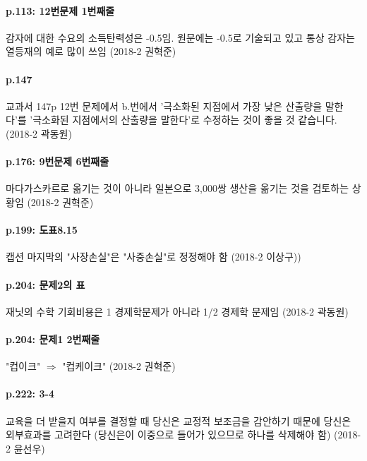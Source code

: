 \documentclass[a4paper]{article}
\begin{document}
\paragraph{p.113: 12번문제 1번째줄} %
\label{par:p_113_12}
감자에 대한 수요의 소득탄력성은 -0.5임. 원문에는 -0.5로 기술되고 있고 통상 감자는 열등재의 예로 많이 쓰임 (2018-2 권혁준)

\paragraph{p.147} %
\label{par:p_147}
교과서 147p 12번 문제에서 b.번에서 '극소화된 지점에서 가장 낮은 산출량을 말한다'를 '극소화된 지점에서의 산출량을 말한다'로 수정하는 것이 좋을 것 같습니다. (2018-2 곽동원)

\paragraph{p.176: 9번문제 6번째줄} %
\label{par:p_176_9}
마다가스카르로 옮기는 것이 아니라 일본으로 3,000쌍 생산을 옮기는 것을 검토하는 상황임 (2018-2 권혁준)

\paragraph{p.199: 도표8.15} %
\label{par:p_199_}
캡션 마지막의 "사장손실"은 "사중손실"로 정정해야 함 (2018-2 이상구))

\paragraph{p.204: 문제2의 표} %
\label{par:p_204_}
재닛의 수학 기회비용은 1 경제학문제가 아니라 1/2 경제학 문제임
(2018-2 곽동원)

\paragraph{p.204: 문제1 2번째줄} %
\label{par:p_204}
"컵이크" $\Rightarrow$ "컵케이크" (2018-2 권혁준)

\paragraph{p.222: 3-4} %
\label{par:p_222_3_4}
교육을 더 받을지 여부를 결정할 때 당신은 교정적 보조금을 감안하기 때문에 당신은 외부효과를 고려한다 (당신은이 이중으로 들어가 있으므로 하나를 삭제해야 함) (2018-2 윤선우)
\end{document}
